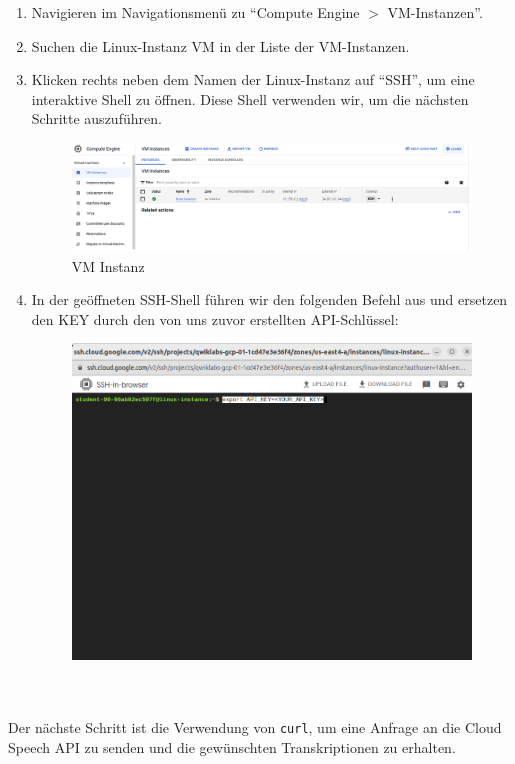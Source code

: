 \documentclass[12pt,a4paper]{article}
\begin{document}
\begin{enumerate}
	\item Navigieren im Navigationsmenü zu \enquote{Compute Engine $>$ VM-Instanzen}.
	
	\item Suchen die Linux-Instanz VM in der Liste der VM-Instanzen. 
	
	\item Klicken rechts neben dem Namen der Linux-Instanz auf \enquote{SSH}, um eine interaktive Shell zu öffnen. Diese Shell verwenden wir, um die nächsten Schritte auszuführen.

\begin{figure}[h!]
	\centering
	\includegraphics[width=1\linewidth]{../images/VM_Instances}
	\caption{VM Instanz}
	\label{fig:vminstances}
\end{figure}

	\item In der geöffneten SSH-Shell führen wir den folgenden Befehl aus und ersetzen den KEY durch den von uns zuvor erstellten API-Schlüssel:

\begin{figure}[h!]
	\centering
	\includegraphics[width=0.7\linewidth]{../images/SSH}
	\label{fig:ssh}
\end{figure}
\end{enumerate}
\ \\ \\
Der nächste Schritt ist die Verwendung von \texttt{curl}, um eine Anfrage an die Cloud Speech API zu senden und die gewünschten Transkriptionen zu erhalten. 
\end{document}
